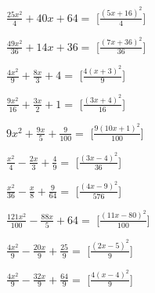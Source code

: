 \begin{esercizio}
\begin{multicols}{2}
\begin{enumeratea}
\item \(\frac{25 x^{2}}{4} + 40 x + 64=\) 
\hfill [\(\frac{\left(5 x + 16\right)^{2}}{4}\)]
\item \(\frac{49 x^{2}}{36} + 14 x + 36=\) 
\hfill [\(\frac{\left(7 x + 36\right)^{2}}{36}\)]
\item \(\frac{4 x^{2}}{9} + \frac{8 x}{3} + 4=\) 
\hfill [\(\frac{4 \left(x + 3\right)^{2}}{9}\)]
\item \(\frac{9 x^{2}}{16} + \frac{3 x}{2} + 1=\) 
\hfill [\(\frac{\left(3 x + 4\right)^{2}}{16}\)]
\item \(9 x^{2} + \frac{9 x}{5} + \frac{9}{100}=\) 
\hfill [\(\frac{9 \left(10 x + 1\right)^{2}}{100}\)]
\item \(\frac{x^{2}}{4} - \frac{2 x}{3} + \frac{4}{9}=\) 
\hfill [\(\frac{\left(3 x - 4\right)^{2}}{36}\)]
\item \(\frac{x^{2}}{36} - \frac{x}{8} + \frac{9}{64}=\) 
\hfill [\(\frac{\left(4 x - 9\right)^{2}}{576}\)]
\item \(\frac{121 x^{2}}{100} - \frac{88 x}{5} + 64=\) 
\hfill [\(\frac{\left(11 x - 80\right)^{2}}{100}\)]
\item \(\frac{4 x^{2}}{9} - \frac{20 x}{9} + \frac{25}{9}=\) 
\hfill [\(\frac{\left(2 x - 5\right)^{2}}{9}\)]
\item \(\frac{4 x^{2}}{9} - \frac{32 x}{9} + \frac{64}{9}=\) 
\hfill [\(\frac{4 \left(x - 4\right)^{2}}{9}\)]

\end{enumeratea}
\end{multicols}
\end{esercizio}
